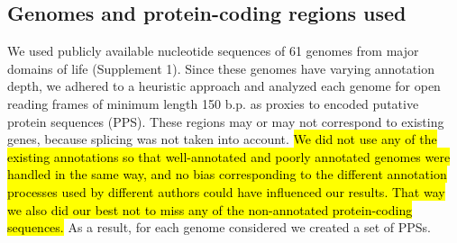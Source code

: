 \subsection{Genomes and protein-coding regions used}
We used publicly available nucleotide sequences of 61 genomes from major
domains of life (Supplement 1). Since these genomes have varying annotation
depth, we adhered to a heuristic approach and analyzed each genome for open
reading frames of minimum length 150 b.p. as proxies to encoded putative
protein sequences (PPS). These regions may or may not correspond to existing 
genes, because splicing was not taken into account.
\hl{We did not use any of the
existing annotations so that well-annotated and poorly annotated genomes were
handled in the same way, and no bias corresponding to the different annotation
processes used by different authors could have influenced our results. That way
we also did our best not to miss any of the non-annotated protein-coding
sequences.}
As a result, for each genome considered we created a set of PPSs.
